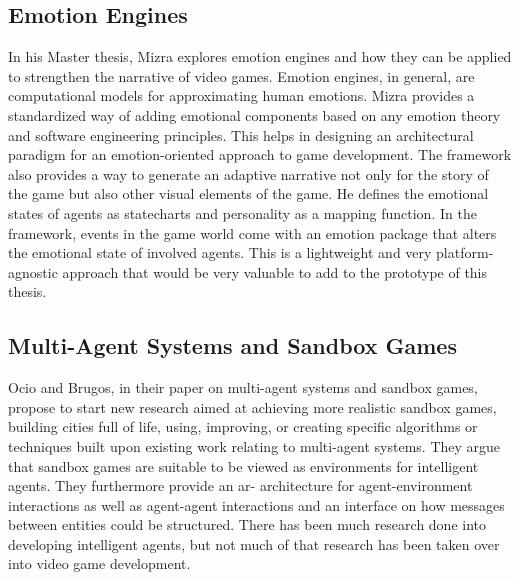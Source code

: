 \subsection{Emotion Engines}
\label{section:emotion}
In his Master thesis, Mizra explores emotion engines and how they can be applied to strengthen the narrative of video games. Emotion engines, in general, are computational models for approximating human emotions. Mizra provides a standardized way of adding emotional components based on any emotion theory and software engineering principles. This helps in designing an architectural paradigm for an emotion-oriented approach to game development. The framework also provides a way to generate an adaptive narrative not only for the story of the game but also other visual elements of the game. He defines the emotional states of agents as statecharts and personality as a mapping function. In the framework, events in the game world come with an emotion package that alters the emotional state of involved agents. This is a lightweight and very platform-agnostic approach that would be very valuable to add to the prototype of this thesis.~\cite{Mizra2021}
\subsection{Multi-Agent Systems and Sandbox Games}
Ocio and Brugos, in their paper on multi-agent systems and sandbox games, propose to start new research aimed at achieving more realistic sandbox games, building cities full of life, using, improving, or creating specific algorithms or techniques built upon existing work relating to multi-agent systems. They argue that sandbox games are suitable to be viewed as environments for intelligent agents. They furthermore provide an ar- architecture for agent-environment interactions as well as agent-agent interactions and an interface on how messages between entities could be structured. There has been much research done into developing intelligent agents, but not much of that research has been taken over into video game development.~\cite{Barriales2009}